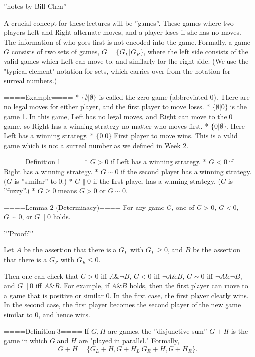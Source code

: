 
''notes by Bill Chen''

A crucial concept for these lectures will be ''games''. These games where two players Left and Right alternate moves, and a player loses if she has no moves. The information of who goes first is not encoded into the game. Formally, a game $G$ consists of two sets of games, $G=\{G_L|G_R\}$, where the left side consists of the valid games which Left can move to, and similarly for the right side. (We use the "typical element" notation for sets, which carries over from the notation for surreal numbers.)

====Example====
* $\{\emptyset|\emptyset\}$ is called the zero game (abbreviated 0). There are no legal moves for either player, and the first player to move loses.
* $\{\emptyset|0\}$ is the game 1. In this game, Left has no legal moves, and Right can move to the 0 game, so Right has a winning strategy no matter who moves first.
* $\{0|\emptyset\}$. Here Left has a winning strategy.
* $\{0|0\}$ First player to move wins. This is a valid game which is not a surreal number as we defined in Week 2.

====Definition 1====
* $G>0$ if Left has a winning strategy.
* $G<0$ if Right has a winning strategy.
* $G\sim 0$ if the second player has a winning strategy. ($G$ is ''similar'' to $0$.)
* $G\parallel 0$ if the first player has a winning strategy. ($G$ is ''fuzzy''.)
* $G\ge 0$ means $G>0$ or $G\sim 0$.

====Lemma 2 (Determinacy)====
For any game $G$, one of $G>0$, $G<0$, $G\sim 0$, or $G\parallel 0$ holds.

'''Proof:'''

Let $A$ be the assertion that there is a $G_L$ with $G_L\ge 0$, and $B$ be the assertion that there is a $G_R$ with $G_R\le 0$.

Then one can check that $G>0$ iff $A\& \neg B$, $G<0$ iff $\neg A \& B$, $G\sim 0$ iff $\neg A \& \neg B$, and $G\parallel 0$ iff $A\& B$. For example, if $A \& B$ holds, then the first player can move to a game that is positive or similar $0$. In the first case, the first player clearly wins. In the second case, the first player becomes the second player of the new game similar to $0$, and hence wins.

====Definition 3====
If $G,H$ are games, the ''disjunctive sum'' $G+H$ is the game in which $G$ and $H$ are "played in parallel." Formally,
$$G+H=\{G_L+H,G+H_L|G_R+H, G+H_R\}.$$

